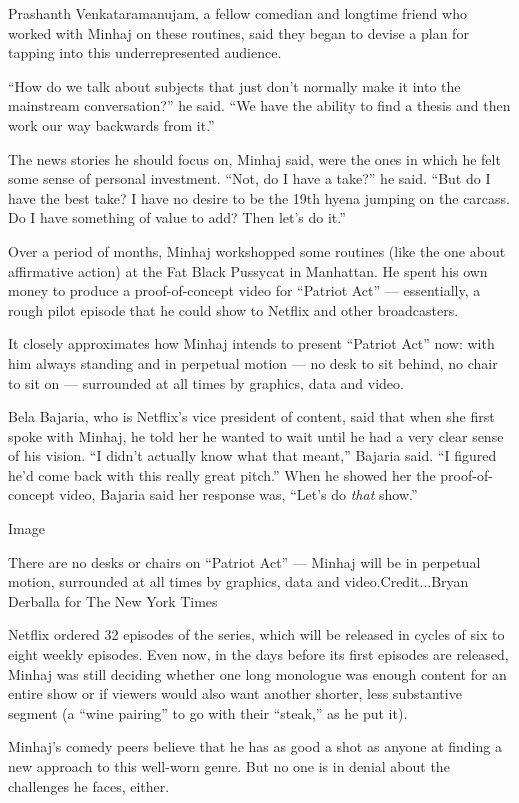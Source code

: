 Prashanth Venkataramanujam, a fellow comedian and longtime friend who
worked with Minhaj on these routines, said they began to devise a plan
for tapping into this underrepresented audience.

``How do we talk about subjects that just don't normally make it into
the mainstream conversation?'' he said. ``We have the ability to find a
thesis and then work our way backwards from it.''

The news stories he should focus on, Minhaj said, were the ones in which
he felt some sense of personal investment. ``Not, do I have a take?'' he
said. ``But do I have the best take? I have no desire to be the 19th
hyena jumping on the carcass. Do I have something of value to add? Then
let's do it.''

Over a period of months, Minhaj workshopped some routines (like the one
about affirmative action) at the Fat Black Pussycat in Manhattan. He
spent his own money to produce a proof-of-concept video for ``Patriot
Act'' --- essentially, a rough pilot episode that he could show to
Netflix and other broadcasters.

It closely approximates how Minhaj intends to present ``Patriot Act''
now: with him always standing and in perpetual motion --- no desk to sit
behind, no chair to sit on --- surrounded at all times by graphics, data
and video.

Bela Bajaria, who is Netflix's vice president of content, said that when
she first spoke with Minhaj, he told her he wanted to wait until he had
a very clear sense of his vision. ``I didn't actually know what that
meant,'' Bajaria said. ``I figured he'd come back with this really great
pitch.'' When he showed her the proof-of-concept video, Bajaria said her
response was, ``Let's do \emph{that} show.''

Image

There are no desks or chairs on ``Patriot Act'' --- Minhaj will be in
perpetual motion, surrounded at all times by graphics, data and
video.Credit...Bryan Derballa for The New York Times

Netflix ordered 32 episodes of the series, which will be released in
cycles of six to eight weekly episodes. Even now, in the days before its
first episodes are released, Minhaj was still deciding whether one long
monologue was enough content for an entire show or if viewers would also
want another shorter, less substantive segment (a ``wine pairing'' to go
with their ``steak,'' as he put it).

Minhaj's comedy peers believe that he has as good a shot as anyone at
finding a new approach to this well-worn genre. But no one is in denial
about the challenges he faces, either.

